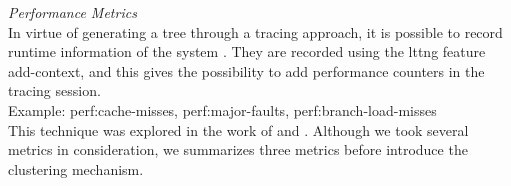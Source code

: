 \textit{Performance Metrics}\\
    In virtue of generating a tree through a tracing approach, it is possible to record runtime information of the system \cite{francis1}.
    They are recorded using the lttng feature add-context, and this gives the possibility to add performance counters in the tracing session.\\
    Example: perf:cache-misses, perf:major-faults, perf:branch-load-misses\\
    This technique was explored in the work of \cite{doray_thesis} and \cite{olsa}.
    Although we took several metrics in consideration, we summarizes three metrics before introduce the clustering mechanism.\\
    
      
      
    
    
